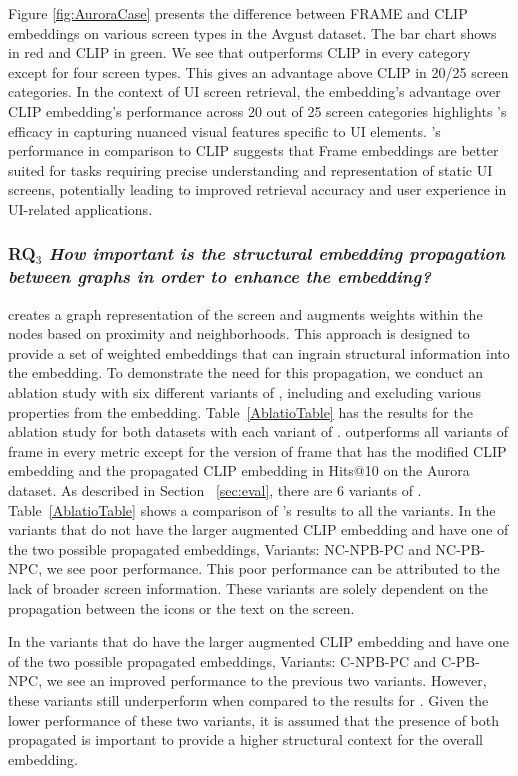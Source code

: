 Figure \ref{fig:AuroraCase} presents the difference between FRAME and CLIP embeddings on various screen types in the Avgust dataset. The bar chart shows \FRAME in red and CLIP in green. We see that \FRAME outperforms CLIP in every category except for four screen types. This gives \FRAME an advantage above CLIP in 20/25 screen categories. In the context of UI screen retrieval, the \FRAME embedding's advantage over CLIP embedding's performance across 20 out of 25 screen categories highlights \FRAME 's efficacy in capturing nuanced visual features specific to UI elements. \FRAME's performance in comparison to CLIP suggests that Frame embeddings are better suited for tasks requiring precise understanding and representation of static UI screens, potentially leading to improved retrieval accuracy and user experience in UI-related applications. 


\subsubsection{\textbf{RQ$_3$} \textit{How important is the structural embedding propagation between graphs in order to enhance the embedding?}}


\FRAME creates a graph representation of the screen and augments weights within the nodes based on proximity and neighborhoods. This approach is designed to provide a set of weighted embeddings that can ingrain structural information into the embedding. To demonstrate the need for this propagation, we conduct an ablation study with six different variants of \FRAME, including and excluding various properties from the embedding. Table~\ref{AblatioTable} has the results for the ablation study for both datasets with each variant of \FRAME. \FRAME outperforms all variants of frame in every metric except for the version of frame that has the modified CLIP embedding and the propagated CLIP embedding in Hits@10 on the Aurora dataset. As described in Section ~\ref{sec:eval}, there are 6 variants of \FRAME. Table~\ref{AblatioTable} shows a comparison of \FRAME's results to all the variants.  
In the variants that do not have the larger augmented CLIP embedding and have one of the two possible propagated embeddings, Variants: NC-NPB-PC and NC-PB-NPC, we see poor performance. This poor performance can be attributed to the lack of broader screen information. These variants are solely dependent on the propagation between the icons or the text on the screen. 

In the variants that do have the larger augmented CLIP embedding and have one of the two possible propagated embeddings, Variants: C-NPB-PC and C-PB-NPC, we see an improved performance to the previous two variants. However, these variants still underperform when compared to the results for \FRAME. Given the lower performance of these two variants, it is assumed that the presence of both propagated is important to provide a higher structural context for the overall embedding. 

